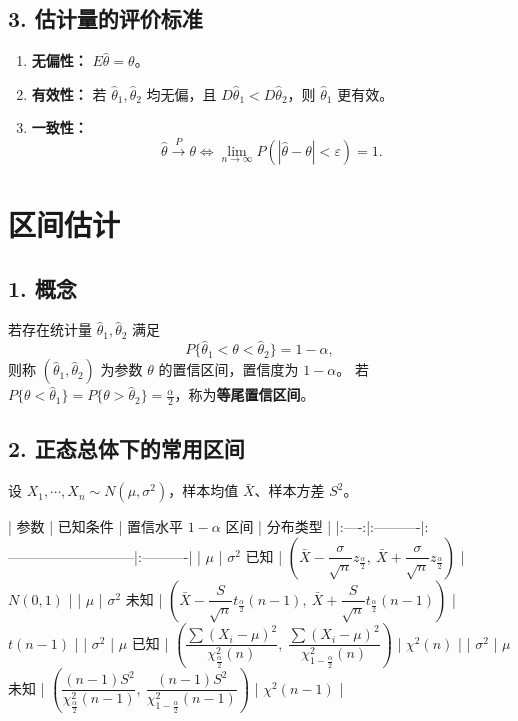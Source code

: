 \subsection*{3. 估计量的评价标准}

\begin{enumerate}
      \item \textbf{无偏性：} $E\hat{\theta}=\theta$。
      \item \textbf{有效性：} 若 $\hat{\theta}_1,\hat{\theta}_2$ 均无偏，且 $D\hat{\theta}_1 < D\hat{\theta}_2$，则 $\hat{\theta}_1$ 更有效。
      \item \textbf{一致性：}
            \[
                  \hat{\theta}\xrightarrow{P}\theta
                  \Leftrightarrow
                  \lim_{n\to\infty}P(|\hat{\theta}-\theta|<\varepsilon)=1.
            \]
\end{enumerate}

\section{区间估计}

\subsection*{1. 概念}

若存在统计量 $\hat{\theta}_1,\hat{\theta}_2$ 满足
\[
      P\{\hat{\theta}_1<\theta<\hat{\theta}_2\}=1-\alpha,
\]
则称 $(\hat{\theta}_1,\hat{\theta}_2)$ 为参数 $\theta$ 的置信区间，置信度为 $1-\alpha$。
若 $P\{\theta<\hat{\theta}_1\}=P\{\theta>\hat{\theta}_2\}=\frac{\alpha}{2}$，称为\textbf{等尾置信区间}。

\subsection*{2. 正态总体下的常用区间}

设 $X_1,\cdots,X_n\sim N(\mu,\sigma^2)$，样本均值 $\bar{X}$、样本方差 $S^2$。

| 参数 | 已知条件 | 置信水平 $1-\alpha$ 区间 | 分布类型 |
|:----:|:----------|:---------------------------|:----------|
| $\mu$ | $\sigma^2$ 已知 | $\left(\bar{X}-\dfrac{\sigma}{\sqrt{n}}z_{\frac{\alpha}{2}},\ \bar{X}+\dfrac{\sigma}{\sqrt{n}}z_{\frac{\alpha}{2}}\right)$ | $N(0,1)$ |
| $\mu$ | $\sigma^2$ 未知 | $\left(\bar{X}-\dfrac{S}{\sqrt{n}}t_{\frac{\alpha}{2}}(n-1),\ \bar{X}+\dfrac{S}{\sqrt{n}}t_{\frac{\alpha}{2}}(n-1)\right)$ | $t(n-1)$ |
| $\sigma^2$ | $\mu$ 已知 | $\left(\dfrac{\sum (X_i-\mu)^2}{\chi^2_{\frac{\alpha}{2}}(n)},\ \dfrac{\sum (X_i-\mu)^2}{\chi^2_{1-\frac{\alpha}{2}}(n)}\right)$ | $\chi^2(n)$ |
| $\sigma^2$ | $\mu$ 未知 | $\left(\dfrac{(n-1)S^2}{\chi^2_{\frac{\alpha}{2}}(n-1)},\ \dfrac{(n-1)S^2}{\chi^2_{1-\frac{\alpha}{2}}(n-1)}\right)$ | $\chi^2(n-1)$ |

